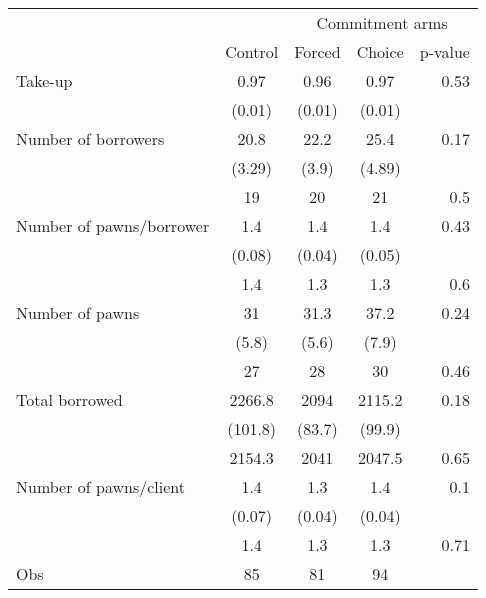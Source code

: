 \begin{tabular}{lcccr}
\toprule
      &       & \multicolumn{3}{c}{Commitment arms} \\
\cmidrule{3-5}      & Control & Forced & Choice & \multicolumn{1}{c}{p-value} \\
\midrule
\midrule
Take-up & 0.97  & 0.96  & 0.97  & 0.53 \\
      & (0.01) & (0.01) & (0.01) &  \\
\midrule
Number of borrowers & 20.8  & 22.2  & 25.4  & 0.17 \\
      & (3.29) & (3.9) & (4.89) &  \\
\rowcolor[rgb]{ .949,  .949,  .949} \multicolumn{1}{r}{median} & 19    & 20    & 21    & 0.5 \\
\midrule
Number of pawns/borrower & 1.4   & 1.4   & 1.4   & 0.43 \\
      & (0.08) & (0.04) & (0.05) &  \\
\rowcolor[rgb]{ .949,  .949,  .949} \multicolumn{1}{r}{median} & 1.4   & 1.3   & 1.3   & 0.6 \\
\midrule
Number of pawns  & 31    & 31.3  & 37.2  & 0.24 \\
      & (5.8) & (5.6) & (7.9) &  \\
\rowcolor[rgb]{ .949,  .949,  .949} \multicolumn{1}{r}{median} & 27    & 28    & 30    & 0.46 \\
\midrule
Total borrowed & 2266.8 & 2094  & 2115.2 & 0.18 \\
      & (101.8) & (83.7) & (99.9) &  \\
\rowcolor[rgb]{ .949,  .949,  .949} \multicolumn{1}{r}{median} & 2154.3 & 2041  & 2047.5 & 0.65 \\
\midrule
Number of pawns/client & 1.4   & 1.3   & 1.4   & 0.1 \\
      & (0.07) & (0.04) & (0.04) &  \\
\rowcolor[rgb]{ .949,  .949,  .949} \multicolumn{1}{r}{median} & 1.4   & 1.3   & 1.3   & 0.71 \\
\midrule
Obs   & 85    & 81    & 94    &  \\
\bottomrule
\bottomrule
\end{tabular}%
